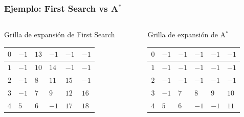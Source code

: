 \begin{frame}
    \frametitle{Ejemplo: First Search vs A$^{*}$}
    \begin{footnotesize}
        \begin{columns}[t]
            \begin{column}{5cm}
                \begin{center}
                    Grilla de expansión de First Search
                \end{center}
                \begin{tabularx}{\columnwidth}{|X|X|X|X|X|X|}	
                    \hline
                    $0$ & $-1$ & $13$ & $-1$ & $-1$ & $-1$ \\
                    \hline
                    $1$ & $-1$ & $10$ & $14$ & $-1$ & $-1$ \\
                    \hline
                    $2$ & $-1$ & $8$ & $11$ & $15$ & $-1$ \\
                    \hline
                    $3$ & $-1$ & $7$ & $9$ & $12$ & $16$ \\
                    \hline
                    $4$ & $5$ & $6$ & $-1$ & $17$ & $18$ \\
                    \hline
                \end{tabularx}
            \end{column}
            \begin{column}{5cm}
                \begin{center}
                    Grilla de expansión de A$^{*}$
                \end{center}		
                \begin{tabularx}{\columnwidth}{|X|X|X|X|X|X|}		
                    \hline
                    $0$ & $-1$ & $-1$ & $-1$ & $-1$ & $-1$ \\
                    \hline
                    $1$ & $-1$ & $-1$ & $-1$ & $-1$ & $-1$ \\
                    \hline
                    $2$ & $-1$ & $-1$ & $-1$ & $-1$ & $-1$ \\
                    \hline
                    $3$ & $-1$ & $7$ & $8$ & $9$ & $10$ \\
                    \hline
                    $4$ & $5$ & $6$ & $-1$ & $-1$ & $11$ \\
                    \hline
                \end{tabularx}
            \end{column}
        \end{columns}
        

\end{footnotesize}
\end{frame}
